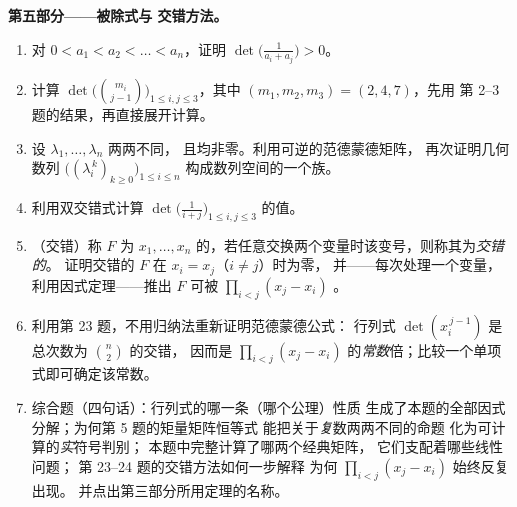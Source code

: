 \begin{problem}
\medskip
\noindent\textbf{第五部分——被除式与
交错方法。}
\begin{enumerate}[resume]
  \item 对 $0 < a_1 < a_2 < \dots < a_n$，证明
        $\det\bigl(\frac{1}{a_i + a_j}\bigr) > 0$。
  \item 计算 $\det\bigl(\binom{m_i}{j-1}\bigr)_{1 \leq i, j
        \leq 3}$，其中 $(m_1, m_2, m_3) = (2, 4, 7)$，先用
        第 2--3 题的结果，再直接展开计算。
  \item 设 $\lambda_1, \dots, \lambda_n$ 两两不同，
        且均非零。利用可逆的范德蒙德矩阵，
        再次证明几何数列
        $\bigl((\lambda_i^{\,k})_{k \geq 0}\bigr)_{1 \leq i \leq
        n}$ 构成数列空间的一个族。
  \item 利用双交错式计算 $\det\bigl(\frac{1}{i + j}\bigr)_{1 \leq i, j
        \leq 3}$ 的值。
  \item （交错）称 $F$ 为 $x_1,
        \dots, x_n$ 的，若任意交换两个变量时该变号，则称其为\emph{交错的}。
        证明交错的 $F$
        在 $x_i = x_j$（$i \neq j$）时为零，
        并——每次处理一个变量，利用因式定理——推出 $F$
        可被 $\prod_{i<j}(x_j - x_i)$ 。
  \item 利用第 23 题，不用归纳法重新证明范德蒙德公式：
        行列式 $\det(x_i^{\,j-1})$ 是
        总次数为 $\binom n2$ 的交错，
        因而是 $\prod_{i<j}(x_j -
        x_i)$ 的\emph{常数}倍；比较一个单项式即可确定该常数。
  \item 综合题（四句话）：行列式的哪一条（哪个公理）性质
        生成了本题的全部因式分解；为何第 5 题的矩量矩阵恒等式
        能把关于\emph{复}数两两不同的命题
        化为可计算的\emph{实}符号判别；
        本题中完整计算了哪两个经典矩阵，
        它们支配着哪些线性问题；
        第 23--24 题的交错方法如何一步解释
        为何 $\prod_{i<j}(x_j -
        x_i)$ 始终反复出现。
        并点出第三部分所用定理的名称。
\end{enumerate}
\end{problem}

